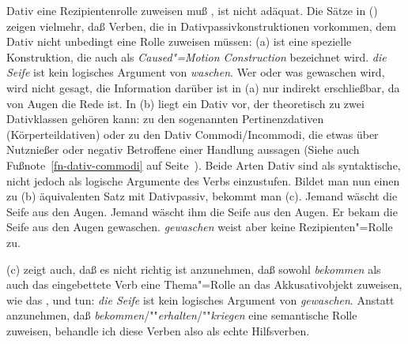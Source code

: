 Dativ eine Rezipientenrolle zuweisen muß \citep[]{Gunkel2003b},
ist nicht adäquat.
Die Sätze in () zeigen vielmehr, daß Verben, die in Dativpassivkonstruktionen
vorkommen, dem Dativ nicht unbedingt eine Rolle zuweisen müssen:
(a) ist eine spezielle Konstruktion, die auch als \emph{Caused"=Motion
Construction} bezeichnet wird. \emph{die Seife} ist kein logisches
Argument von \emph{waschen}. Wer oder was gewaschen wird, wird nicht gesagt,
die Information darüber ist in (a) nur indirekt erschließbar, da
von Augen die Rede ist. In (b) liegt ein Dativ vor, der theoretisch
zu zwei Dativklassen gehören kann: zu den sogenannten Pertinenzdativen
(Körperteildativen) oder zu den Dativ Commodi/Incommodi,
die etwas über Nutznießer oder negativ Betroffene einer Handlung aussagen
(Siehe auch Fußnote~\ref{fn-dativ-commodi} auf Seite~\pageref{fn-dativ-commodi}). Beide Arten
Dativ sind als syntaktische, nicht jedoch als logische Argumente des Verbs einzustufen.
Bildet man nun einen zu (b) äquivalenten Satz mit Dativpassiv,
bekommt man (c).
\eal
\label{ex-bekommen-passive-und-waschen}
\ex Jemand wäscht     die Seife aus den Augen.
\ex Jemand wäscht ihm die Seife aus den Augen.
\ex\label{ex-er-bekam-die-seife-aus-den-augen-gewaschen}
Er bekam die Seife aus den Augen gewaschen.
\zl
\emph{gewaschen} weist aber keine Rezipienten"=Rolle zu.

(c) zeigt auch, daß es nicht richtig ist anzunehmen, daß sowohl \emph{bekommen} als auch das
eingebettete Verb eine Thema"=Rolle an das Akkusativobjekt zuweisen,
wie das \citet[]{Haider86}, \citet[]{HM94a}
und \citet[]{Kathol2000a} tun: \emph{die Seife} ist kein logisches
Argument von \emph{gewaschen}.
Anstatt anzunehmen, daß \emph{bekommen}/""\emph{erhalten}/""\emph{kriegen} 
eine semantische Rolle zuweisen, behandle ich diese Verben also als echte Hilfsverben.


